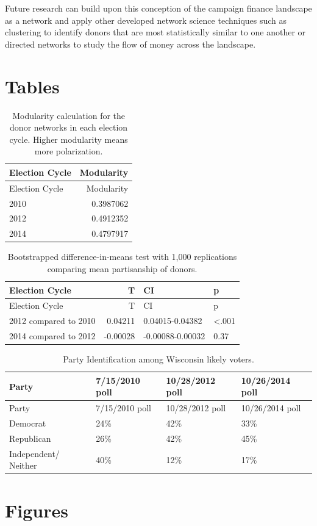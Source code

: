 \documentclass[12pt,]{article}
\begin{document}
Future research can build upon this conception of the campaign finance
landscape as a network and apply other developed network science
techniques such as clustering to identify donors that are most
statistically similar to one another or directed networks to study the
flow of money across the landscape.

\newpage

\hypertarget{tables}{%
\section{Tables}\label{tables}}

\begin{longtable}[]{@{}lr@{}}
\caption{Modularity calculation for the donor networks in each election
cycle. Higher modularity means more polarization.}\tabularnewline
\toprule
Election Cycle & Modularity\tabularnewline
\midrule
\endfirsthead
\toprule
Election Cycle & Modularity\tabularnewline
\midrule
\endhead
2010 & 0.3987062\tabularnewline
2012 & 0.4912352\tabularnewline
2014 & 0.4797917\tabularnewline
\bottomrule
\end{longtable}

\newpage

\begin{longtable}[]{@{}lrll@{}}
\caption{Bootstrapped difference-in-means test with 1,000 replications
comparing mean partisanship of donors.}\tabularnewline
\toprule
Election Cycle & T & CI & p\tabularnewline
\midrule
\endfirsthead
\toprule
Election Cycle & T & CI & p\tabularnewline
\midrule
\endhead
2012 compared to 2010 & 0.04211 & 0.04015-0.04382 &
\textless.001\tabularnewline
2014 compared to 2012 & -0.00028 & -0.00088-0.00032 &
0.37\tabularnewline
\bottomrule
\end{longtable}

\newpage

\begin{longtable}[]{@{}llll@{}}
\caption{Party Identification among Wisconsin likely
voters.}\tabularnewline
\toprule
Party & 7/15/2010 poll & 10/28/2012 poll & 10/26/2014
poll\tabularnewline
\midrule
\endfirsthead
\toprule
Party & 7/15/2010 poll & 10/28/2012 poll & 10/26/2014
poll\tabularnewline
\midrule
\endhead
Democrat & 24\% & 42\% & 33\%\tabularnewline
Republican & 26\% & 42\% & 45\%\tabularnewline
Independent/ Neither & 40\% & 12\% & 17\%\tabularnewline
\bottomrule
\end{longtable}

\newpage

\hypertarget{figures}{%
\section{Figures}\label{figures}}
\end{document}
